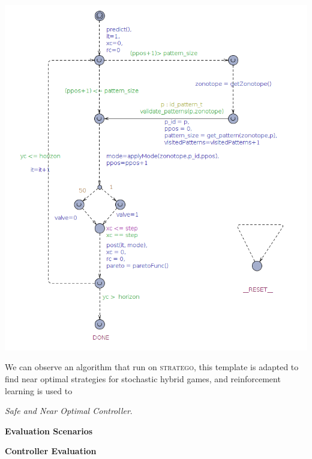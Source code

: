     \begin{minipage}{\linewidth}
      \begin{center}
          \includegraphics[width=1.0\linewidth]{images/automaton_uppaal}
      \end{center}
      \label{strategotemplate}
    \end{minipage}
    We can observe an algorithm that run on \textsc{stratego}, this template 
    is adapted to find near optimal strategies for stochastic hybrid games, 
     and
    reinforcement learning is used to 

    \emph{Safe and Near Optimal Controller}.


    \textbf{Evaluation Scenarios}

    \textbf{Controller Evaluation}

